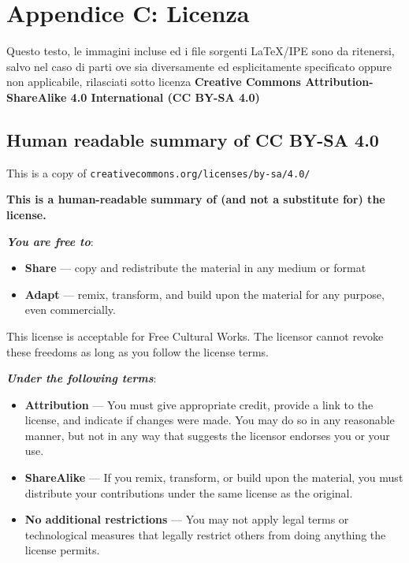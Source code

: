 %
\chapter{Appendice C: Licenza}
Questo testo, le immagini incluse ed i file sorgenti LaTeX/IPE sono da ritenersi, salvo nel caso di parti ove sia diversamente ed esplicitamente specificato oppure non applicabile, rilasciati sotto licenza \textbf{Creative Commons Attribution-ShareAlike 4.0 International (CC BY-SA 4.0)}

\section*{Human readable summary of CC BY-SA 4.0}
This is a copy of \texttt{creativecommons.org/licenses/by-sa/4.0/}

\textbf{This is a human-readable summary of (and not a substitute for) the license.}

\textbf{\textit{You are free to}}:
	\begin{itemize}
		\item \textbf{Share} — copy and redistribute the material in any medium or format
		\item \textbf{Adapt} — remix, transform, and build upon the material for any purpose, even commercially.
	\end{itemize}
This license is acceptable for Free Cultural Works.
The licensor cannot revoke these freedoms as long as you follow the license terms.

\textbf{\textit{Under the following terms}}:
	\begin{itemize}
		\item \textbf{Attribution} — You must give appropriate credit, provide a link to the license, and indicate if changes were made. You may do so in any reasonable manner, but not in any way that suggests the licensor endorses you or your use.
		\item \textbf{ShareAlike} — If you remix, transform, or build upon the material, you must distribute your contributions under the same license as the original.
		\item \textbf{No additional restrictions} — You may not apply legal terms or technological measures that legally restrict others from doing anything the license permits.
	\end{itemize}

